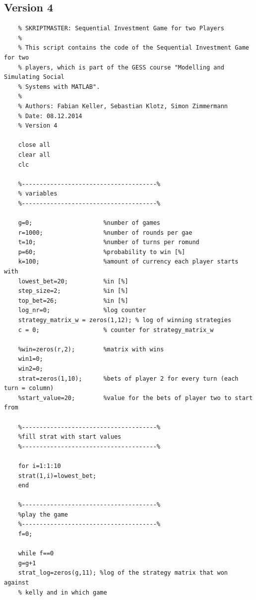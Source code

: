 \documentclass[11pt]{article}
\begin{document}
\subsection{Version 4}
\begin{lstlisting}
	% SKRIPTMASTER: Sequential Investment Game for two Players
	%
	% This script contains the code of the Sequential Investment Game for two
	% players, which is part of the GESS course "Modelling and Simulating Social
	% Systems with MATLAB".
	%
	% Authors: Fabian Keller, Sebastian Klotz, Simon Zimmermann
	% Date: 08.12.2014
	% Version 4
	
	close all
	clear all
	clc
	
	%--------------------------------------%
	% variables
	%--------------------------------------%
	
	g=0;                    %number of games
	r=1000;                 %number of rounds per gae
	t=10;                   %number of turns per romund
	p=60;                   %probability to win [%]
	k=100;                  %amount of currency each player starts with
	lowest_bet=20;          %in [%]
	step_size=2;            %in [%]
	top_bet=26;             %in [%]
	log_nr=0;               %log counter
	strategy_matrix_w = zeros(1,12); % log of winning strategies
	c = 0;                  % counter for strategy_matrix_w
	
	%win=zeros(r,2);        %matrix with wins
	win1=0;
	win2=0;
	strat=zeros(1,10);      %bets of player 2 for every turn (each turn = column)
	%start_value=20;        %value for the bets of player two to start from
	
	%--------------------------------------%
	%fill strat with start values
	%--------------------------------------%
	
	for i=1:1:10
	strat(1,i)=lowest_bet;
	end
	
	%--------------------------------------%
	%play the game
	%--------------------------------------%
	f=0;
	
	while f==0
	g=g+1
	strat_log=zeros(g,11); %log of the strategy matrix that won against 
	% kelly and in which game
	

\end{lstlisting}
\end{document}
